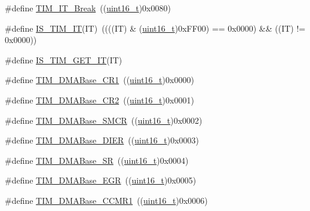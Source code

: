 \begin{DoxyCompactItemize}
\item 
\#define \hyperlink{group___t_i_m__interrupt__sources_gad16adab3ac1a4a552a86da069702f24b}{T\+I\+M\+\_\+\+I\+T\+\_\+\+Break}~((\hyperlink{_p_e___types_8h_a1f1825b69244eb3ad2c7165ddc99c956}{uint16\+\_\+t})0x0080)
\item 
\#define \hyperlink{group___t_i_m__interrupt__sources_ga14fce0f8dbe0925e45b415b34bd162c9}{I\+S\+\_\+\+T\+I\+M\+\_\+\+IT}(IT)~((((IT) \& (\hyperlink{_p_e___types_8h_a1f1825b69244eb3ad2c7165ddc99c956}{uint16\+\_\+t})0x\+F\+F00) == 0x0000) \&\& ((\+I\+T) != 0x0000))
\item 
\#define \hyperlink{group___t_i_m__interrupt__sources_ga38e9d740c8d4ed8fcaced73816c124e6}{I\+S\+\_\+\+T\+I\+M\+\_\+\+G\+E\+T\+\_\+\+IT}(IT)
\item 
\#define \hyperlink{group___t_i_m___d_m_a___base__address_ga73bca5b14da2d5026fa3877d0db53740}{T\+I\+M\+\_\+\+D\+M\+A\+Base\+\_\+\+C\+R1}~((\hyperlink{_p_e___types_8h_a1f1825b69244eb3ad2c7165ddc99c956}{uint16\+\_\+t})0x0000)
\item 
\#define \hyperlink{group___t_i_m___d_m_a___base__address_ga50e894f0d2cecc1ff3a3578098c3246e}{T\+I\+M\+\_\+\+D\+M\+A\+Base\+\_\+\+C\+R2}~((\hyperlink{_p_e___types_8h_a1f1825b69244eb3ad2c7165ddc99c956}{uint16\+\_\+t})0x0001)
\item 
\#define \hyperlink{group___t_i_m___d_m_a___base__address_ga748e24ac0675caa55869d6ba506448df}{T\+I\+M\+\_\+\+D\+M\+A\+Base\+\_\+\+S\+M\+CR}~((\hyperlink{_p_e___types_8h_a1f1825b69244eb3ad2c7165ddc99c956}{uint16\+\_\+t})0x0002)
\item 
\#define \hyperlink{group___t_i_m___d_m_a___base__address_gaeddacbbc2adf9705feac250f077d8c93}{T\+I\+M\+\_\+\+D\+M\+A\+Base\+\_\+\+D\+I\+ER}~((\hyperlink{_p_e___types_8h_a1f1825b69244eb3ad2c7165ddc99c956}{uint16\+\_\+t})0x0003)
\item 
\#define \hyperlink{group___t_i_m___d_m_a___base__address_ga5cda07a11a76bbb24a7d5bb680814d31}{T\+I\+M\+\_\+\+D\+M\+A\+Base\+\_\+\+SR}~((\hyperlink{_p_e___types_8h_a1f1825b69244eb3ad2c7165ddc99c956}{uint16\+\_\+t})0x0004)
\item 
\#define \hyperlink{group___t_i_m___d_m_a___base__address_gab5e6f6c3fea100896d13ce317a6ccd8e}{T\+I\+M\+\_\+\+D\+M\+A\+Base\+\_\+\+E\+GR}~((\hyperlink{_p_e___types_8h_a1f1825b69244eb3ad2c7165ddc99c956}{uint16\+\_\+t})0x0005)
\item 
\#define \hyperlink{group___t_i_m___d_m_a___base__address_gaab384496cff3e54d8179fc0db727c7ee}{T\+I\+M\+\_\+\+D\+M\+A\+Base\+\_\+\+C\+C\+M\+R1}~((\hyperlink{_p_e___types_8h_a1f1825b69244eb3ad2c7165ddc99c956}{uint16\+\_\+t})0x0006)

\end{DoxyCompactItemize}
